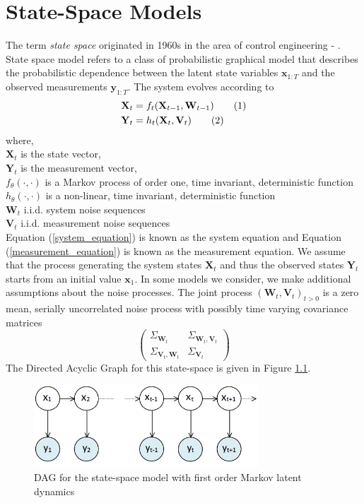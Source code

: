 \documentclass[11pt,a4,twosided,singlespacing,titlepagenumber=on]{scrreprt}
\numberwithin{equation}{chapter} %
\theoremstyle{remark}
\newcommand{\matr}[1]{\mathbf{#1}}
\newcommand\numberthis{\addtocounter{equation}{1}\tag{\theequation}}
\begin{document}
\chapter{State-Space Models}
\label{section:ssm}
The term \textit{state space} originated in 1960s in the area of control engineering - \cite{kalman1960}. State space model refers to a class of probabilistic graphical model that describes the probabilistic dependence between the latent state variables $\matr{x}_{1:T}$ and the observed measurements $\matr{y}_{1:T}$. The system evolves according to
\begin{align*}
\matr{X}_t &= f_t(\matr{X}_{t-1},\matr{W}_{t-1}) \numberthis \label{system_equation} \\
\matr{Y}_t &= h_t(\matr{X}_t, \matr{V}_t) \numberthis \label{measurement_equation}
\end{align*}
where, \\
$\matr{X}_t$ is the state vector, \\
$\matr{Y}_t$ is the measurement vector, \\
$f_\theta(\cdot, \cdot)$ is a Markov process of order one, time invariant, deterministic function \\
$h_\theta(\cdot, \cdot)$ is a non-linear, time invariant, deterministic function \\
$\matr{W}_t$ i.i.d. system noise sequences \\
$\matr{V}_t$ i.i.d. measurement noise sequences \\
Equation (\ref{system_equation}) is known as the system equation and Equation (\ref{measurement_equation}) is known as the measurement equation. We assume that the process generating the system states $\matr{X}_t$ and thus the observed states $\matr{Y}_t$ starts from an initial value $\matr{x}_1$. In some models we consider, we make additional assumptions about the noise processes. The joint process $(\matr{W}_t, \matr{V}_t)_{t>0}$ is a zero mean, serially uncorrelated noise process with possibly time varying covariance matrices
\begin{equation}
\begin{pmatrix}
\Sigma_{\matr{W}_t} & \Sigma_{\matr{W}_t, \matr{V}_t}\\
\Sigma_{\matr{V}_t, \matr{W}_t} & \Sigma_{\matr{V}_t} \label{corr_ssm}
\end{pmatrix}
\end{equation}
The Directed Acyclic Graph for this state-space is given in Figure \ref{state_space_models}.
\begin{figure}[H]
\centering
\includegraphics[width = 0.75\textwidth]{state_space_models}
\caption{DAG for the state-space model with first order Markov latent dynamics}
\label{state_space_models}
\end{figure}
\end{document}

